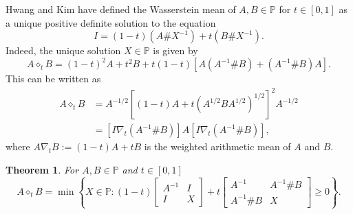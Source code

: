 \documentclass[12pt,reqno]{amsart}
\newtheorem{theorem}{Theorem}[section]
\DeclareMathOperator{\tr}{\mathrm{tr}}
\begin{document}



Hwang and Kim \cite{HK19} have defined the Wasserstein mean of $A, B \in \mathbb{P}$ for $t \in [0,1]$ as a unique positive definite solution to the equation
\begin{equation} \label{E:Wass-eq}
I = (1-t) (A \# X^{-1}) + t (B \# X^{-1}).
\end{equation}
Indeed, the unique solution $X \in \mathbb{P}$ is given by
\begin{displaymath}
A \diamond_{t} B = (1-t)^{2} A + t^{2} B + t(1-t) \left[ A (A^{-1} \# B) + (A^{-1} \# B) A \right].
\end{displaymath}
This can be written as
\begin{equation} \label{E:Wass-expression}
\begin{split}
A \diamond_{t} B & = A^{-1/2} [ (1-t)A + t(A^{1/2} B A^{1/2})^{1/2} ]^{2} A^{-1/2} \\
& = \left[ I \nabla_{t} (A^{-1} \# B) \right] A \left[ I \nabla_{t} (A^{-1} \# B)
\right],
\end{split}
\end{equation}
where $A \nabla_{t} B := (1-t) A + t B$ is the weighted arithmetic mean of $A$ and $B$.

\begin{theorem}
For $A, B \in \mathbb{P}$ and $t \in [0,1]$
\begin{displaymath}
A \diamond_{t} B = \min \left\{
X \in \mathbb{P}: (1-t)
\begin{bmatrix}
  A^{-1} & I \\
  I & X
\end{bmatrix} + t
\begin{bmatrix}
  A^{-1} & A^{-1} \# B \\
  A^{-1}  \# B & X
\end{bmatrix} \geq 0
\right\}.
\end{displaymath}
\end{theorem}
\end{document}
